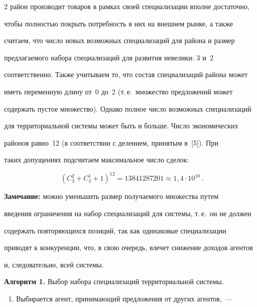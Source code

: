 \begin{multicols}{2}
район производит товаров в рамках своей специализации вполне достаточно, 


чтобы полностью покрыть потребность в них на внешнем рынке, а также 


считаем, что чис\-ло новых возможных специализаций для района и размер 


предлагаемого набора специализаций для развития невелики: 3 и~2 


соответственно. Также учитываем то, что состав специализаций района может 


иметь переменную длину от~0 до~2 (т.\,е.\ множество предложений может 


содержать пустое множество). Однако полное число возможных специализаций 


для территориальной системы может быть и больше. Число экономических 


районов равно~12 (в соответствии с делением, принятым в~[5]). При 


таких допущениях подсчитаем максимальное число сделок: 


  $$


  (C_3^2+C_3^1+1)^{12}=13841287201\approx 1{,}4\cdot 10^{10}\,.


  $$







\noindent


\textbf{Замечание:} можно уменьшить размер получаемого множества путем 


введения ограничения на набор специализаций для системы, т.\,е.\ он не должен 


содержать повторяющихся позиций, так как одинаковые специализации 


приводят к конкуренции, что, в свою очередь, влечет снижение доходов агентов 


и, следовательно, всей системы.





\medskip





\noindent


\textbf{Алгоритм 1.} Выбор набора специализаций территориальной системы.


\begin{enumerate}[1.]


\item Выбирается агент, принимающий предложения от других агентов,~--- 



\end{enumerate}
\end{multicols}
